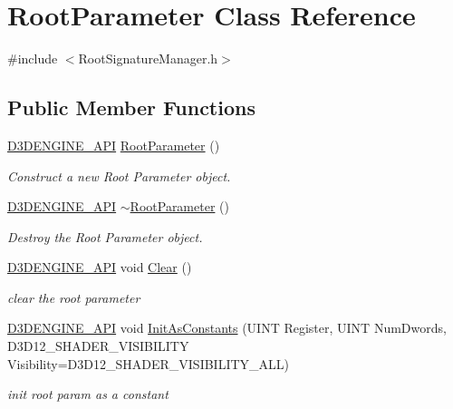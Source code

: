 \hypertarget{class_root_parameter}{}\section{Root\+Parameter Class Reference}
\label{class_root_parameter}


{\ttfamily \#include $<$Root\+Signature\+Manager.\+h$>$}

\subsection*{Public Member Functions}
\begin{DoxyCompactItemize}
\item 
\mbox{\hyperlink{stdafx_8h_a8ee2d990c5dfba7794dd2b60741d7722}{D3\+D\+E\+N\+G\+I\+N\+E\+\_\+\+A\+PI}} \mbox{\hyperlink{class_root_parameter_ab1b513666b2c4c57e10423e8502e356f}{Root\+Parameter}} ()
\begin{DoxyCompactList}\small\item\em Construct a new Root Parameter object. \end{DoxyCompactList}\item 
\mbox{\hyperlink{stdafx_8h_a8ee2d990c5dfba7794dd2b60741d7722}{D3\+D\+E\+N\+G\+I\+N\+E\+\_\+\+A\+PI}} \mbox{\hyperlink{class_root_parameter_aa1d98ffad71c07f54e4a03538b2bc9c9}{$\sim$\+Root\+Parameter}} ()
\begin{DoxyCompactList}\small\item\em Destroy the Root Parameter object. \end{DoxyCompactList}\item 
\mbox{\hyperlink{stdafx_8h_a8ee2d990c5dfba7794dd2b60741d7722}{D3\+D\+E\+N\+G\+I\+N\+E\+\_\+\+A\+PI}} void \mbox{\hyperlink{class_root_parameter_af34b58a76d42011f188669331756d348}{Clear}} ()
\begin{DoxyCompactList}\small\item\em clear the root parameter \end{DoxyCompactList}\item 
\mbox{\hyperlink{stdafx_8h_a8ee2d990c5dfba7794dd2b60741d7722}{D3\+D\+E\+N\+G\+I\+N\+E\+\_\+\+A\+PI}} void \mbox{\hyperlink{class_root_parameter_a7477d1b81ca872aa6ca16a71bbafc500}{Init\+As\+Constants}} (U\+I\+NT Register, U\+I\+NT Num\+Dwords, D3\+D12\+\_\+\+S\+H\+A\+D\+E\+R\+\_\+\+V\+I\+S\+I\+B\+I\+L\+I\+TY Visibility=D3\+D12\+\_\+\+S\+H\+A\+D\+E\+R\+\_\+\+V\+I\+S\+I\+B\+I\+L\+I\+T\+Y\+\_\+\+A\+LL)
\begin{DoxyCompactList}\small\item\em init root param as a constant \end{DoxyCompactList}\item 

\end{DoxyCompactItemize}
